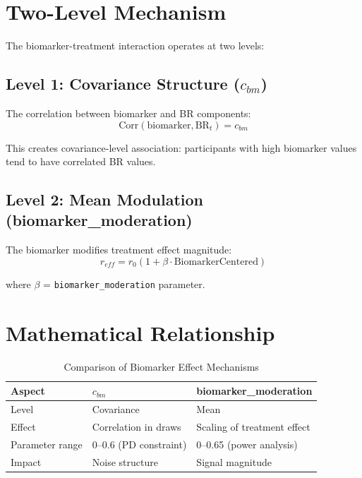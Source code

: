 \documentclass[11pt]{article}
\theoremstyle{definition}
\begin{document}
\section{Two-Level Mechanism}

The biomarker-treatment interaction operates at two levels:

\subsection{Level 1: Covariance Structure ($c_{bm}$)}

The correlation between biomarker and BR components:
\begin{equation}
\text{Corr}(\text{biomarker}, \text{BR}_t) = c_{bm}
\end{equation}

This creates covariance-level association: participants with high biomarker
values tend to have correlated BR values.

\subsection{Level 2: Mean Modulation (biomarker\_moderation)}

The biomarker modifies treatment effect magnitude:
\begin{equation}
r_{eff} = r_0 (1 + \beta \cdot \text{BiomarkerCentered})
\end{equation}

where $\beta$ = \texttt{biomarker\_moderation} parameter.

\section{Mathematical Relationship}

\begin{table}[h]
\centering
\caption{Comparison of Biomarker Effect Mechanisms}
\begin{tabular}{@{}lll@{}}
\toprule
\textbf{Aspect} & \textbf{$c_{bm}$} & \textbf{biomarker\_moderation} \\
\midrule
Level & Covariance & Mean \\
Effect & Correlation in draws & Scaling of treatment effect \\
Parameter range & 0--0.6 (PD constraint) & 0--0.65 (power analysis) \\
Impact & Noise structure & Signal magnitude \\
\bottomrule
\end{tabular}
\end{table}
\end{document}
